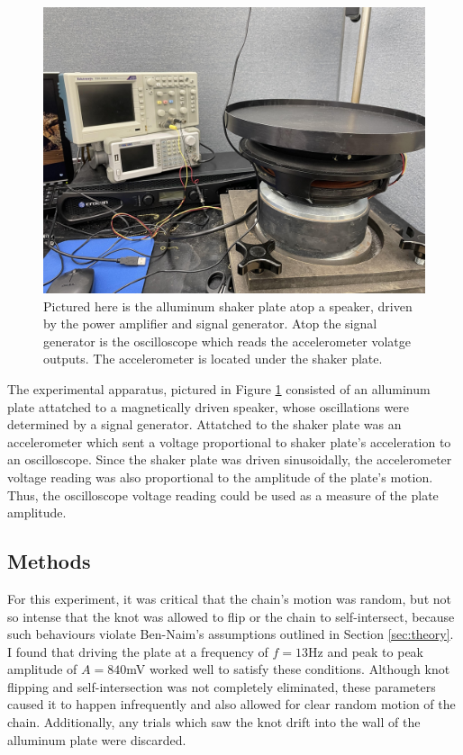 \documentclass[11pt]{article}
\begin{document}
    \begin{figure}[H]
        \centering
        \includegraphics[scale=0.06]{setup.jpg}
        \caption{Pictured here is the alluminum shaker plate atop a speaker, driven by the power
        amplifier and signal generator. Atop the signal generator is the oscilloscope which reads the 
        accelerometer volatge outputs. The accelerometer is located under the shaker plate.}
        \label{fig:setup}
    \end{figure}
    The experimental apparatus, pictured in Figure \ref{fig:setup} consisted of an alluminum plate attatched to a magnetically 
    driven speaker, whose oscillations were determined by a signal generator. Attatched to
    the shaker plate was an accelerometer which sent a voltage proportional to shaker plate's acceleration
    to an oscilloscope. Since the shaker plate was driven sinusoidally, the 
    accelerometer voltage reading was also proportional to the amplitude of the plate's motion. Thus, 
    the oscilloscope voltage reading could be used as a measure of the plate amplitude.\\

\subsection{Methods}
    For this experiment, it was critical that the chain's motion was random, but not so intense 
    that the knot was allowed to flip or the chain to self-intersect, because such behaviours 
    violate Ben-Naim's assumptions outlined in Section \ref{sec:theory}. I found that driving the plate at a frequency of $f=13$Hz and 
    peak to peak amplitude of $A=840$mV worked well to satisfy these conditions. Although knot flipping 
    and self-intersection was not completely eliminated, these parameters caused it to happen infrequently 
    and also allowed for clear random motion of the chain. Additionally, any trials which saw 
    the knot drift into the wall of the alluminum plate were discarded.\\
\end{document}
